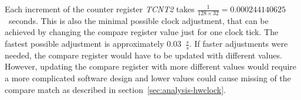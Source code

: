 Each increment of the counter register {\it{TCNT2}} takes
$\frac{1}{128 \times 32} = 0.000244140625$~seconds.
This is also the minimal possible clock adjustment,
that can be achieved by changing the compare register value just for one clock tick.
The fastest possible adjustment is approximately 0.03~$\frac{s}{s}$.
If faster adjustments were needed, the compare register would have to be updated with different values. 
However, updating the compare register with more different values would require
a more complicated software design
and lower values could cause missing of the compare match as described in section~\ref{sec:analysis-hwclock}.
